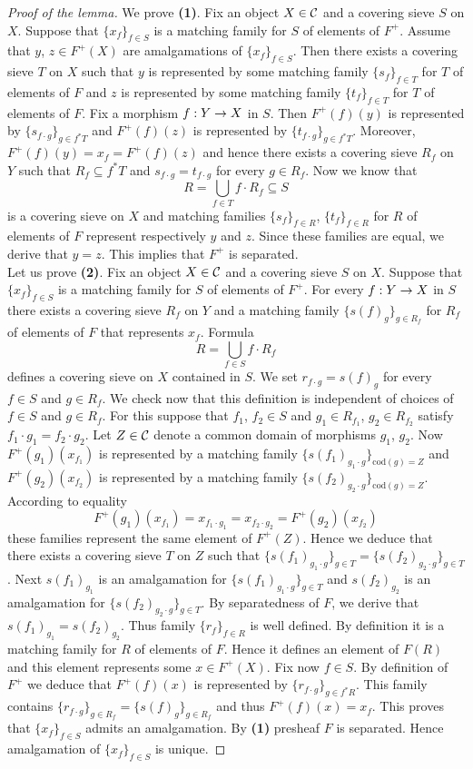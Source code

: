 \begin{proof}[Proof of the lemma]
We prove \textbf{(1)}. Fix an object $X\in {\mathcal C}$ and a covering sieve $S$ on $X$. Suppose that $\{x_f\}_{f\in S}$ is a matching family for $S$ of elements of $F^+$. Assume that $y$, $z\in F^+(X)$ are amalgamations of $\{x_f\}_{f\in S}$. Then there exists a covering sieve $T$ on $X$ such that $y$ is represented by some matching family $\{s_f\}_{f\in T}$ for $T$ of elements of $F$ and $z$ is represented by some matching family $\{t_f\}_{f\in T}$ for $T$ of elements of $F$. Fix a morphism $f:Y\rightarrow X$ in $S$. Then $F^+(f)(y)$ is represented by $\{s_{f\cdot g}\}_{g\in f^*T}$ and $F^+(f)(z)$ is represented by $\{t_{f\cdot g}\}_{g\in f^*T}$. Moreover, $F^+(f)(y)=x_f=F^+(f)(z)$ and hence there exists a covering sieve $R_f$ on $Y$ such that $R_f\subseteq f^*T$ and $s_{f\cdot g}=t_{f\cdot g}$ for every $g\in R_f$. Now we know that 
$$R=\bigcup_{f\in T}f\cdot R_f\subseteq S$$
is a covering sieve on $X$ and matching families $\{s_f\}_{f\in R}$, $\{t_f\}_{f\in R}$ for $R$ of elements of $F$ represent respectively $y$ and $z$. Since these families are equal, we derive that $y=z$. This implies that $F^+$ is separated.\\
Let us prove \textbf{(2)}. Fix an object $X\in {\mathcal C}$ and a covering sieve $S$ on $X$. Suppose that $\{x_f\}_{f\in S}$ is a matching family for $S$ of elements of $F^+$. For every $f:Y\rightarrow X$ in $S$ there exists a covering sieve $R_f$ on $Y$ and a matching family $\{s(f)_g\}_{g\in R_f}$ for $R_f$ of elements of $F$ that represents $x_f$. Formula
$$R=\bigcup_{f\in S}f\cdot R_f$$
defines a covering sieve on $X$ contained in $S$. We set $r_{f\cdot g}=s(f)_g$ for every $f\in S$ and $g\in R_f$. We check now that this definition is independent of choices of $f\in S$ and $g\in R_f$. For this suppose that $f_1$, $f_2\in S$ and $g_1\in R_{f_1}$, $g_2\in R_{f_2}$ satisfy $f_1\cdot g_1=f_2\cdot g_2$. Let $Z\in {\mathcal C}$ denote a common domain of morphisms $g_1$, $g_2$. Now $F^+(g_1)(x_{f_1})$ is represented by a matching family $\{s(f_1)_{g_1\cdot g}\}_{\mathrm{cod}(g)=Z}$ and $F^+(g_2)(x_{f_2})$ is represented by a matching family $\{s(f_2)_{g_2\cdot g}\}_{\mathrm{cod}(g)=Z}$. According to equality
$$F^+(g_1)(x_{f_1})=x_{f_1\cdot g_1}=x_{f_2\cdot g_2}=F^+(g_2)(x_{f_2})$$
these families represent the same element of $F^+(Z)$. Hence we deduce that there exists a covering sieve $T$ on $Z$ such that $\{s(f_1)_{g_1\cdot g}\}_{g\in T}=\{s(f_2)_{g_2\cdot g}\}_{g\in T}$. Next $s(f_1)_{g_1}$ is an amalgamation for $\{s(f_1)_{g_1\cdot g}\}_{g\in T}$ and $s(f_2)_{g_2}$ is an amalgamation for $\{s(f_2)_{g_2\cdot g}\}_{g\in T}$. By separatedness of $F$, we derive that $s(f_1)_{g_1}=s(f_2)_{g_2}$. Thus family $\{r_f\}_{f\in R}$ is well defined. By definition it is a matching family for $R$ of elements of $F$. Hence it defines an element of $F(R)$ and this element represents some $x\in F^+(X)$. Fix now $f\in S$. By definition of $F^+$ we deduce that $F^+(f)(x)$ is represented by $\{r_{f\cdot g}\}_{g\in f^*R}$. This family contains $\{r_{f\cdot g}\}_{g\in R_f}=\{s(f)_{g}\}_{g\in R_f}$ and thus $F^+(f)(x)=x_f$. This proves that $\{x_f\}_{f\in S}$ admits an amalgamation. By \textbf{(1)} presheaf $F$ is separated. Hence amalgamation of $\{x_f\}_{f\in S}$ is unique.
\end{proof}

